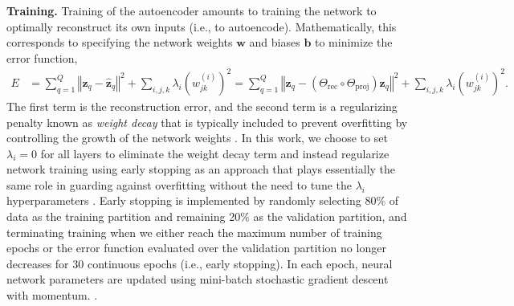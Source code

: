 \documentclass[12pt]{article}
\newcommand*{\blauwr}[1]{#1}
\begin{document}
\textbf{Training.} Training of the autoencoder amounts to training the network to optimally reconstruct its own inputs (i.e., to autoencode). Mathematically, this corresponds to specifying the network weights $\mathbf{w}$ and biases $\mathbf{b}$ to minimize the error function,
\begin{align}\label{error_fun}
E &= \sum_{q=1}^Q \left\Vert \mathbf{z}_q - \hat{\mathbf{z}}_q \right\Vert^2 + \sum_{i,j,k} \lambda_i \left( w_{jk}^{(i)} \right)^2 = \sum_{q=1}^Q \left\Vert \mathbf{z}_q - (\Theta_\mathrm{rec} \circ \Theta_\mathrm{proj}) \mathbf{z}_q \right\Vert^2 + \sum_{i,j,k} \lambda_i \left( w_{jk}^{(i)} \right)^2.
\end{align}
\blauwr{The first term is the reconstruction error, and the second term is a regularizing penalty known as \textit{weight decay} that is typically included to prevent overfitting by controlling the growth of the network weights \cite{scholz2008nonlinear,friedman2001elements}. In this work, we choose to set $\lambda_i = 0$ for all layers to eliminate the weight decay term and instead regularize network training using early stopping as an approach that plays essentially the same role in guarding against overfitting without the need to tune the $\lambda_i$ hyperparameters \cite{collobert2004links,bengio2012practical}. Early stopping is implemented by randomly selecting 80\% of data as the training partition and remaining 20\% as the validation partition, and terminating training when we either reach the maximum number of training epochs or the error function evaluated over the validation partition no longer decreases for 30 continuous epochs (i.e., early stopping). In each epoch, neural network parameters are updated using mini-batch stochastic gradient descent with momentum. \cite{hassoun1995fundamentals,rumelhart1995backpropagation,rumelhart1988learning,sutskever2013importance}.}
\end{document}
